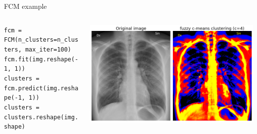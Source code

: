 \documentclass[9pt, aspectratio=169]{beamer}
\begin{document}
\begin{frame}
    {FCM example}
    \begin{columns}
        \begin{column}{.5\textwidth}
            \begin{codebox}
                \texttt{fcm = FCM(n\_clusters=n\_clusters, max\_iter=100)\\
                    fcm.fit(img.reshape(-1, 1))\\
                    clusters = fcm.predict(img.reshape(-1, 1))\\
                    clusters = clusters.reshape(img.shape)
                }
            \end{codebox}
        \end{column}
        \begin{column}{.5\textwidth}
            \includegraphics[width=\textwidth]{FCM_xray.png}
        \end{column}
    \end{columns}
\end{frame}

\end{document}
